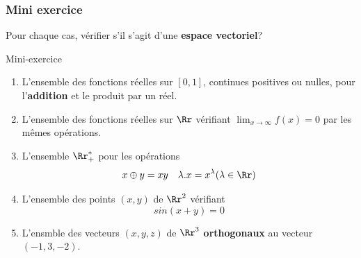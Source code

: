 \documentclass[dvipsnames]{beamer}
\begin{document}
\begin{frame}[t]
  \frametitle{Mini exercice}
  
  \small
  Pour chaque cas, vérifier s'il s'agit d'une \textbf{espace
  vectoriel}?

  \begin{block}{Mini-exercice}
  \begin{enumerate}
    \scriptsize
    \item L'ensemble des fonctions réelles sur $[0,1]$, continues
      positives ou nulles, pour l'\textbf{addition} et le produit par un
      réel.\\[4pt]

    \item L'ensemble des fonctions réelles sur $\Rr$ vérifiant
      $\lim_{x\to \infty} f(x) = 0$ par les mêmes
      opérations.\\[4pt]

    \item L'ensemble $\Rr_{+}^{*}$ pour les opérations 
      \begin{equation*}
        x \oplus y = xy\quad \lambda.x = x^{\lambda}
        (\lambda\in\Rr)
      \end{equation*}
    \item L'ensemble des points $(x,y)$ de $\Rr^{2}$ vérifiant
      \begin{equation*}
        sin(x+y) = 0
      \end{equation*}
    \item L'ensmble des vecteurs $(x,y,z)$ de $\Rr^3$
      \textbf{orthogonaux} au vecteur $(-1,3,-2)$. 
  \end{enumerate}

\end{block}
\end{frame}

\end{document}
